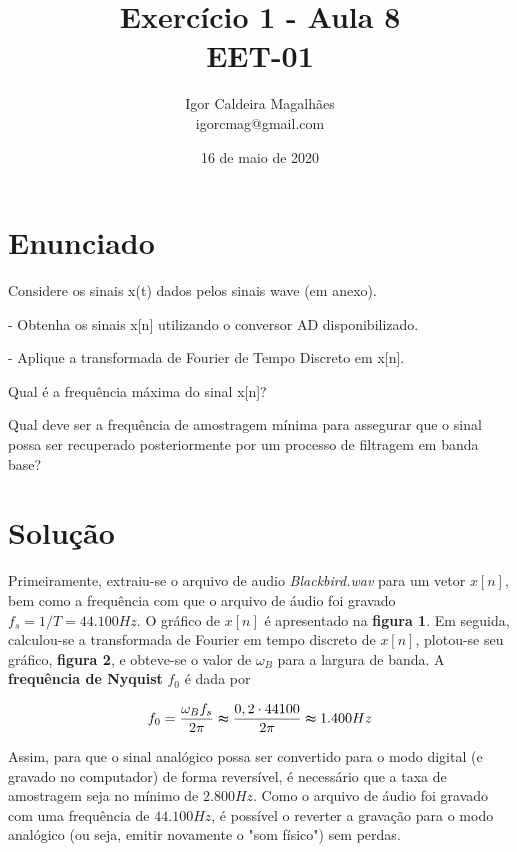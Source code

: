 \documentclass[a4paper, 12pt]{article}
\title{Exercício 1 - Aula 8 \\ EET-01}
\author{
  Igor Caldeira Magalhães\\igorcmag@gmail.com
}
\date{16 de maio de 2020}
\begin{document}
\maketitle
\section{Enunciado}

Considere os sinais x(t) dados pelos sinais wave (em anexo).

- Obtenha os sinais x[n] utilizando o conversor AD disponibilizado.

- Aplique a transformada de Fourier de Tempo Discreto em x[n].

Qual é a frequência máxima do sinal x[n]?

Qual deve ser a frequência de amostragem mínima para assegurar que o sinal possa ser recuperado posteriormente por um processo de filtragem em banda base?


\section{Solução}

Primeiramente, extraiu-se o arquivo de audio \textit{Blackbird.wav} para um vetor $x[n]$, bem como a frequência com que o arquivo de áudio foi gravado $f_s = 1/T = 44.100 Hz$. O gráfico de $x[n]$ é apresentado na \textbf{figura 1}. Em seguida, calculou-se a transformada de Fourier em tempo discreto de $x[n]$, plotou-se seu gráfico, \textbf{figura 2}, e obteve-se o valor de $\omega_B $ para a largura de banda. A \textbf{frequência de Nyquist} $f_0$ é dada por 

$$f_0 = \frac{\omega_B f_s}{2\pi} \thickapprox \frac{0,2\cdot 44100}{2\pi} \thickapprox 1.400 Hz$$

Assim, para que o sinal analógico possa ser convertido para o modo digital (e gravado no computador) de forma reversível, é necessário que a taxa de amostragem seja no mínimo de $2.800 Hz$. Como o arquivo de áudio foi gravado com uma frequência de $44.100 Hz$, é possível o reverter a gravação para o modo analógico (ou seja, emitir novamente o "som físico") sem perdas.


\end{document}

